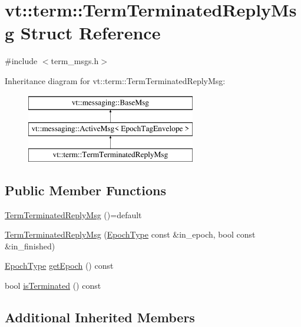 \hypertarget{structvt_1_1term_1_1_term_terminated_reply_msg}{}\section{vt\+:\+:term\+:\+:Term\+Terminated\+Reply\+Msg Struct Reference}
\label{structvt_1_1term_1_1_term_terminated_reply_msg}


{\ttfamily \#include $<$term\+\_\+msgs.\+h$>$}

Inheritance diagram for vt\+:\+:term\+:\+:Term\+Terminated\+Reply\+Msg\+:\begin{figure}[H]
\begin{center}
\leavevmode
\includegraphics[height=3.000000cm]{structvt_1_1term_1_1_term_terminated_reply_msg}
\end{center}
\end{figure}
\subsection*{Public Member Functions}
\begin{DoxyCompactItemize}
\item 
\hyperlink{structvt_1_1term_1_1_term_terminated_reply_msg_ae20713dfddff3aa2e2d17a98b0dd8b9d}{Term\+Terminated\+Reply\+Msg} ()=default
\item 
\hyperlink{structvt_1_1term_1_1_term_terminated_reply_msg_ab59aabefa4f4bf9abb1e60433066a1ac}{Term\+Terminated\+Reply\+Msg} (\hyperlink{namespacevt_a985a5adf291c34a3ca263b3378388236}{Epoch\+Type} const \&in\+\_\+epoch, bool const \&in\+\_\+finished)
\item 
\hyperlink{namespacevt_a985a5adf291c34a3ca263b3378388236}{Epoch\+Type} \hyperlink{structvt_1_1term_1_1_term_terminated_reply_msg_a698733a686553c57a4da26f72fdfb9ab}{get\+Epoch} () const
\item 
bool \hyperlink{structvt_1_1term_1_1_term_terminated_reply_msg_abbac7b1c9254980d0d0c25e1959a6976}{is\+Terminated} () const
\end{DoxyCompactItemize}
\subsection*{Additional Inherited Members}


